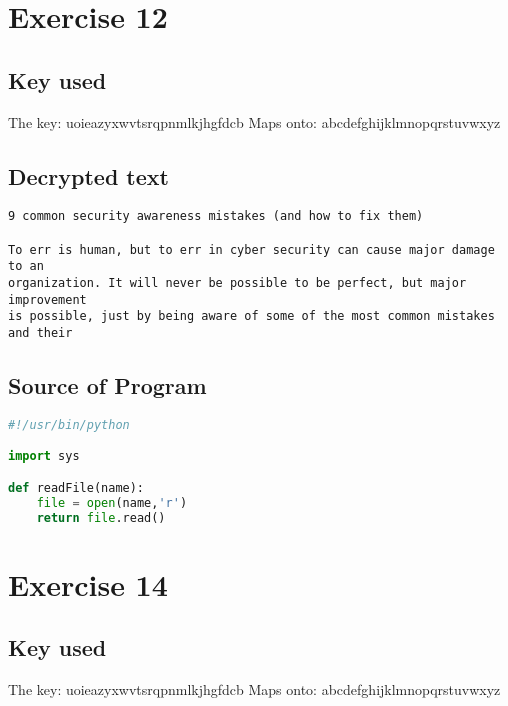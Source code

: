 \documentclass[a4paper]{article}
\begin{document}
\section*{Exercise 12}

\subsection*{Key used}
The key:
uoieazyxwvtsrqpnmlkjhgfdcb\newline
Maps onto: \newline
abcdefghijklmnopqrstuvwxyz\newline

\subsection*{Decrypted text}

\begin{verbatim}
9 common security awareness mistakes (and how to fix them)

To err is human, but to err in cyber security can cause major damage to an
organization. It will never be possible to be perfect, but major improvement
is possible, just by being aware of some of the most common mistakes and their
\end{verbatim}

\subsection*{Source of Program}

\begin{lstlisting}[language=Python]
#!/usr/bin/python

import sys

def readFile(name):
	file = open(name,'r')
	return file.read()

\end{lstlisting}

\section*{Exercise 14}

\subsection*{Key used}
The key:
uoieazyxwvtsrqpnmlkjhgfdcb\newline
Maps onto: \newline
abcdefghijklmnopqrstuvwxyz\newline
\end{document}
